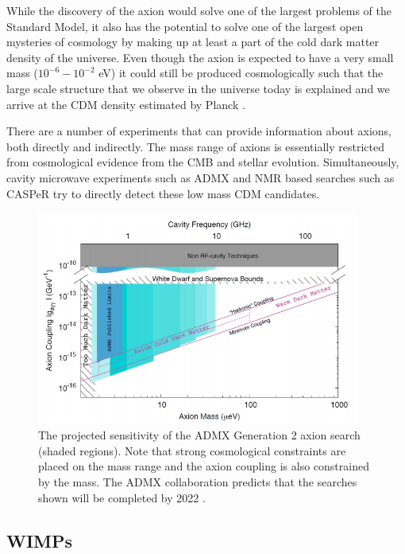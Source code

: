 While the discovery of the axion would solve one of the largest problems of the Standard Model, it also has the potential to solve one of the largest open mysteries of cosmology by making up at least a part of the cold dark matter density of the universe.  Even though the axion is expected to have a very small mass ($10^{-6}-10^{-2}$ eV) it could still be produced cosmologically such that the large scale structure that we observe in the universe today is explained and we arrive at the CDM density estimated by Planck \cite{graham2015experimental}.

    There are a number of experiments that can provide information about axions, both directly and indirectly.  The mass range of axions is essentially restricted from cosmological evidence from the CMB and stellar evolution.  Simultaneously, cavity microwave experiments such as ADMX \cite{stern2016admx} and NMR based searches such as CASPeR \cite{garcon2017searching} try to directly detect these low mass CDM candidates.

\begin{figure}[t]
	\centering
	\includegraphics[width=0.95\textwidth]{admx2_limits}
	\caption{The projected sensitivity of the ADMX Generation 2 axion search (shaded regions).  Note that strong cosmological constraints are placed on the mass range and the axion coupling is also constrained by the mass.  The ADMX collaboration predicts that the searches shown will be completed by 2022 \cite{stern2016admx}.}
\end{figure}

\subsection{WIMPs}


